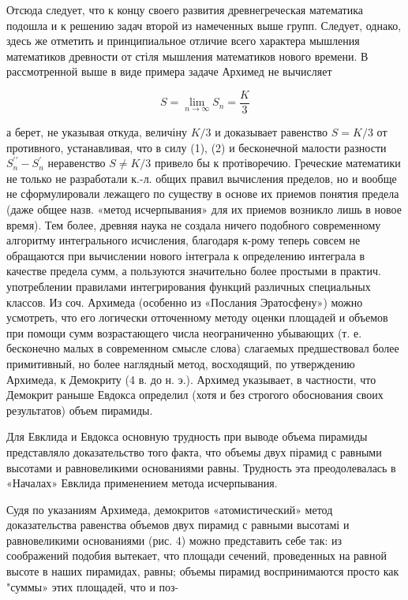 \documentclass[10pt]{article}
\begin{document}
Отсюда следует, что к концу своего развития древнегреческая математика подошла и к решению задач второй из намеченных выше групп. Следует, однако, здесь же отметить и принципиальное отличие всего характера мышления математиков древности от стіля мышления математиков нового времени. В рассмотренной выше в виде примера задаче Архимед не вычисляет



\[

S=\lim _{n \rightarrow \infty} S_{n}=\frac{K}{3}

\]



а берет, не указывая откуда, величіну $K / 3$ и доказывает равенство $S=K / 3$ от противного, устанавливая, что в силу (1), (2) и бесконечной малости разности $S_{n}^{\prime \prime}-S_{n}^{\prime}$ неравенство $S \neq K / 3$ привело бы к протіворечию. Греческие математики не только не разработали к.-л. общих правил вычисления пределов, но и вообще не сформулировали лежащего по существу в основе их приемов понятия предела (даже общее назв. «метод исчерпывания» для их приемов возникло лишь в новое время). Тем более, древняя наука не создала ничего подобного современному алгоритму интегрального исчисления, благодаря к-рому теперь совсем не обращаются при вычислении нового інтеграла к определению интеграла в качестве предела сумм, а пользуются значительно более простыми в практич. употреблении правилами интегрирования функций различных специальных классов. Из соч. Архимеда (особенно из «Послания Эратосфену») можно усмотреть, что его логически отточенному методу оценки площадей и объемов при помощи сумм возрастающего числа неограниченно убывающих (т. е. бесконечно малых в современном смысле слова) слагаемых предшествовал более примитивный, но более наглядный метод, восходящий, по утверждению Архимеда, к Демокриту (4 в. до н. э.). Архимед указывает, в частности, что Демокрит раныше Евдокса определил (хотя и без строгого обоснования своих результатов) объем пирамиды.



Для Евклида и Евдокса основную трудность при выводе объема пирамиды представляло доказательство того факта, что объемы двух пірамид с равными высотами и равновеликими основаниями равны. Трудность эта преодолевалась в «Началах» Евклида применением метода исчерпывания.



Судя по указаниям Архимеда, демокритов «атомистический» метод доказательства равенства объемов двух пирамид с равными высотамі и равновеликими основаниями (рис. 4) можно представить себе так: из соображений подобия вытекает, что площади сечений, проведенных на равной высоте в наших пирамидах, равны; объемы пирамид воспринимаются просто как "суммы» этих площадей, что и поз-
\end{document}
